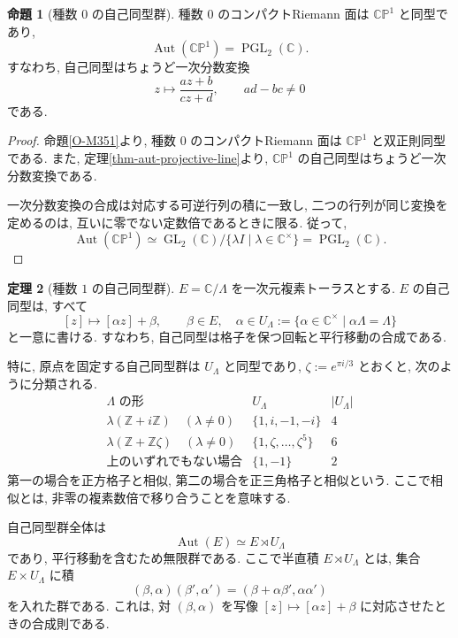 \documentclass[dvipdfmx,a4paper,11pt]{article} %
\newcommand{\Z}{\mathbb{Z}}
\newcommand{\C}{\mathbb{C}}
\theoremstyle{definition}
\newtheorem{thm}{定理}[section]
\numberwithin{equation}{section}
\newtheorem{prop}[thm]{命題}
\begin{document}
\begin{prop}[種数 $0$ の自己同型群]\label{prop-aut-genus-zero}
種数 $0$ のコンパクトRiemann 面は $\C\mathbb P^1$ と同型であり, 
\[
\operatorname{Aut}(\C\mathbb P^1)
=\operatorname{PGL}_2(\mathbb C).
\]
すなわち, 自己同型はちょうど一次分数変換
\[
z\longmapsto\frac{az+b}{cz+d},
\qquad ad-bc\neq0
\]
である.
\end{prop}
\begin{proof}
命題\ref{O-M351}より, 種数 $0$ のコンパクトRiemann 面は
$\C\mathbb P^1$ と双正則同型である.
また, 定理\ref{thm-aut-projective-line}より,
$\C\mathbb P^1$ の自己同型はちょうど一次分数変換である.

一次分数変換の合成は対応する可逆行列の積に一致し,
二つの行列が同じ変換を定めるのは,
互いに零でない定数倍であるときに限る.
従って,
\[
\operatorname{Aut}(\C\mathbb P^1)
\simeq\operatorname{GL}_2(\C)/\{\lambda I\mid\lambda\in\C^\times\}
=\operatorname{PGL}_2(\C).
\]
\end{proof}


\begin{thm}[種数 $1$ の自己同型群]\label{thm-aut-genus-one}
$E=\C/\Lambda$ を一次元複素トーラスとする.
$E$ の自己同型は, すべて
\[
[z]\longmapsto[\alpha z]+\beta,
\qquad
\beta\in E,\quad
\alpha\in U_\Lambda
:=\{\alpha\in\C^\times\mid\alpha\Lambda=\Lambda\}
\]
と一意に書ける.
すなわち, 自己同型は格子を保つ回転と平行移動の合成である.

特に, 原点を固定する自己同型群は $U_\Lambda$ と同型であり,
$\zeta:=e^{\pi i/3}$ とおくと, 次のように分類される.
\[
\begin{array}{c|c|c}
\Lambda\text{ の形} & U_\Lambda & |U_\Lambda|\\ \hline
\lambda(\Z+i\Z)\quad(\lambda\neq0)
& \{1,i,-1,-i\} & 4\\[3pt]
\lambda(\Z+\Z\zeta)\quad(\lambda\neq0)
& \{1,\zeta,\ldots,\zeta^5\} & 6\\[3pt]
\text{上のいずれでもない場合}
& \{1,-1\} & 2
\end{array}
\]
第一の場合を正方格子と相似,
第二の場合を正三角格子と相似という.
ここで相似とは, 非零の複素数倍で移り合うことを意味する.

自己同型群全体は
\[
\operatorname{Aut}(E)\simeq E\rtimes U_\Lambda
\]
であり, 平行移動を含むため無限群である.
ここで半直積 $E\rtimes U_\Lambda$ とは,
集合 $E\times U_\Lambda$ に積
\[
(\beta,\alpha)(\beta',\alpha')
=(\beta+\alpha\beta',\alpha\alpha')
\]
を入れた群である.
これは, 対 $(\beta,\alpha)$ を写像
$[z]\mapsto[\alpha z]+\beta$ に対応させたときの合成則である.

\end{thm}
\end{document}
